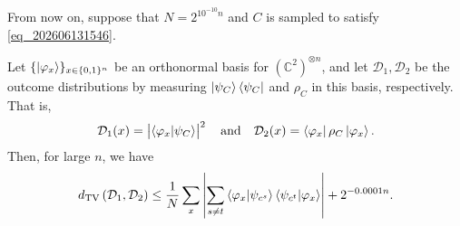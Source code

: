 From now on, suppose that $N=2^{10^{-10}n}$ and $C$ is sampled to satisfy \eqref{eq_202606131546}.
\begin{lemma}
Let $\{\ket{\varphi_x}\}_{x\in\{0,1\}^n}$ be an orthonormal basis for $(\mathbb{C}^2)^{\otimes n}$, and let $\mathcal{D}_1,\mathcal{D}_2$ be the outcome distributions by measuring $\ket{\psi_C}\bra{\psi_C}$ and $\rho_C$ in this basis, respectively.
That is,
\begin{align*}
\mathcal{D}_1(x)=\left|\bra{\varphi_x}\ket{\psi_C}\right|^2 \quad\text{and}\quad\mathcal{D}_2(x)=\bra{\varphi_x}\rho_C\ket{\varphi_x}.
\end{align*}
Then, for large $n$, we have
\begin{align*}
d_{\mathrm{TV}}\left(\mathcal{D}_1,\mathcal{D}_2\right)\le\frac{1}{N}\sum_{x}\left|\sum_{s\neq t}\bra{\varphi_x}\ket{\psi_{c^s}}\bra{\psi_{c^t}}\ket{\varphi_{x}}\right|+2^{-0.0001n}.
\end{align*}
\end{lemma}
